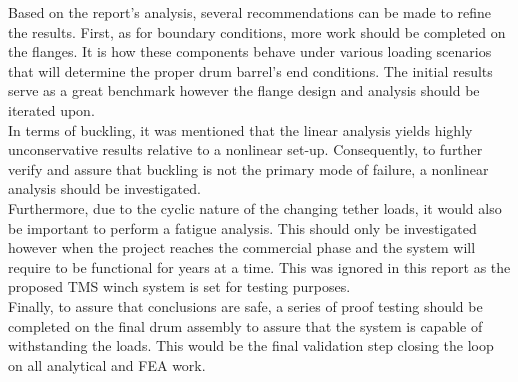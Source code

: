 
Based on the report's analysis, several recommendations can be made to refine the results. First, as for boundary conditions, more work should be completed on the flanges. It is how these components behave under various loading scenarios that will determine the proper drum barrel's end conditions. The initial results serve as a great benchmark however the flange design and analysis should be iterated upon.\\

In terms of buckling, it was mentioned that the linear analysis yields highly unconservative results relative to a nonlinear set-up. Consequently, to further verify and assure that buckling is not the primary mode of failure, a nonlinear analysis should be investigated.\\

Furthermore, due to the cyclic nature of the changing tether loads, it would also be important to perform a fatigue analysis. This should only be investigated however when the project reaches the commercial phase and the system will require to be functional for years at a time. This was ignored in this report as the proposed TMS winch system is set for testing purposes.\\

Finally, to assure that conclusions are safe, a series of proof testing should be completed on the final drum assembly to assure that the system is capable of withstanding the loads. This would be the final validation step closing the loop on all analytical and FEA work.
